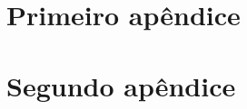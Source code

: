 \documentclass[12pt,openright,twoside,a4paper]{abntex2}
\begin{document}

%
%

\appendix

\chapter{Primeiro apêndice}

\lipsum[50-52]

\chapter{Segundo apêndice}
\lipsum[55-57]


% 
% 
% 



\cleardoublepage
{} 
{}
\printindex
\end{document}
